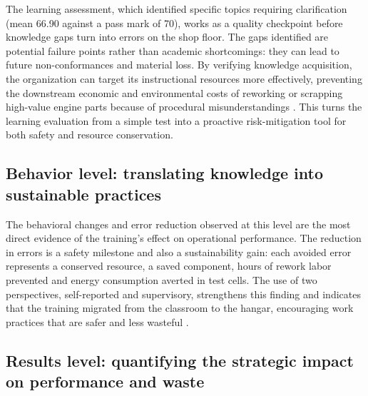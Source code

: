 The learning assessment, which identified specific topics requiring clarification (mean 66.90 against a pass mark of 70), works as a quality checkpoint before knowledge gaps turn into errors on the shop floor. The gaps identified are potential failure points rather than academic shortcomings: they can lead to future non-conformances and material loss. By verifying knowledge acquisition, the organization can target its instructional resources more effectively, preventing the downstream economic and environmental costs of reworking or scrapping high-value engine parts because of procedural misunderstandings \parencite{Chen2023}. This turns the learning evaluation from a simple test into a proactive risk-mitigation tool for both safety and resource conservation.

\subsection{Behavior level: translating knowledge into sustainable practices}
\label{subsec:disc-behavior}

The behavioral changes and error reduction observed at this level are the most direct evidence of the training's effect on operational performance. The reduction in errors is a safety milestone and also a sustainability gain: each avoided error represents a conserved resource, a saved component, hours of rework labor prevented and energy consumption averted in test cells. The use of two perspectives, self-reported and supervisory, strengthens this finding and indicates that the training migrated from the classroom to the hangar, encouraging work practices that are safer and less wasteful \parencite{YangPark2024}. 

\subsection{Results level: quantifying the strategic impact on performance and waste}
\label{subsec:disc-results}

